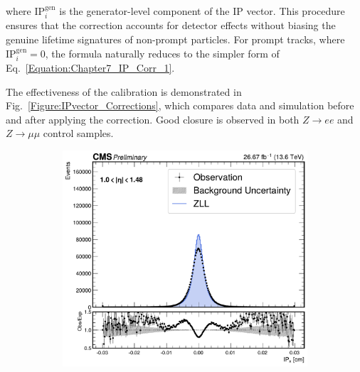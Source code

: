 where $\mathrm{IP}_i^{\mathrm{gen}}$ is the generator-level component of the \ac{IP} vector.
This procedure ensures that the correction accounts for detector effects without biasing the genuine lifetime signatures of non-prompt particles. For prompt tracks, where $\mathrm{IP}_i^{\mathrm{gen}}=0$, the formula naturally reduces to the simpler form of Eq.~\ref{Equation:Chapter7_IP_Corr_1}. 

The effectiveness of the calibration is demonstrated in Fig.~\ref{Figure:IPvector_Corrections}, which compares data and simulation before and after applying the correction. Good closure is observed in both $Z\to ee$ and $Z\to\mu\mu$ control samples.

\begin{figure}[!htbp]
        \centering
        \begin{subfigure}[b]{0.49\textwidth}
            \centering
            \includegraphics[width=\textwidth]{Figures/Chapter7/IP_Corrections/Before/ee/ip_x_1p0to1p48_comparison_with_ratio.pdf}
            \caption{}
        \end{subfigure}
        \begin{subfigure}[b]{0.49\textwidth}
            \centering

\end{subfigure}
\end{figure}
